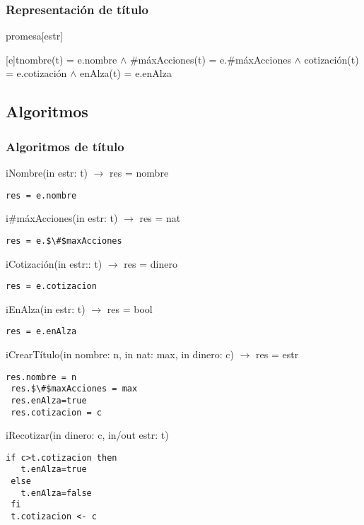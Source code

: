 \subsubsection{Representaci\'on de t\'itulo}
\begin{Estructura}{promesa}[estr]
    \begin{Tupla}[estr]
    \end{Tupla}
\end{Estructura}


[e]{t}{nombre(t) = e.nombre $\land$ $\#$m\'axAcciones(t) = e.$\#$m\'axAcciones $\land$ cotizaci\'on(t) = e.cotizaci\'on $\land$ enAlza(t) = e.enAlza}

  \subsection{Algoritmos}
\subsubsection{Algoritmos de t\'itulo}

iNombre(in estr: t) $\rightarrow$ res = nombre
\begin{lstlisting}[mathescape]
 res = e.nombre
\end{lstlisting}

i$\#$m\'axAcciones(in estr: t) $\rightarrow$ res = nat
\begin{lstlisting}[mathescape]
 res = e.$\#$maxAcciones
\end{lstlisting}

iCotizaci\'on(in estr:: t) $\rightarrow$ res = dinero
\begin{lstlisting}[mathescape]
 res = e.cotizacion
\end{lstlisting}


iEnAlza(in estr: t) $\rightarrow$ res = bool
\begin{lstlisting}[mathescape]
 res = e.enAlza
\end{lstlisting}

iCrearT\'itulo(in nombre: n, in nat: max, in dinero: c) $\rightarrow$ res = estr
\begin{lstlisting}[mathescape]
 res.nombre = n
 res.$\#$maxAcciones = max
 res.enAlza=true
 res.cotizacion = c
\end{lstlisting}

iRecotizar(in dinero: c, in/out estr: t)
\begin{lstlisting}[mathescape]
 if c>t.cotizacion then
   t.enAlza=true
 else
   t.enAlza=false
 fi
 t.cotizacion <- c
\end{lstlisting}
